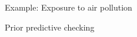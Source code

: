 \documentclass[t]{beamer}
\begin{document}
\begin{frame}{Example: Exposure to air pollution}

  Prior predictive checking
  \vspace{-1\baselineskip}
  \begin{center}
\end{center}
\end{frame}
\end{document}
